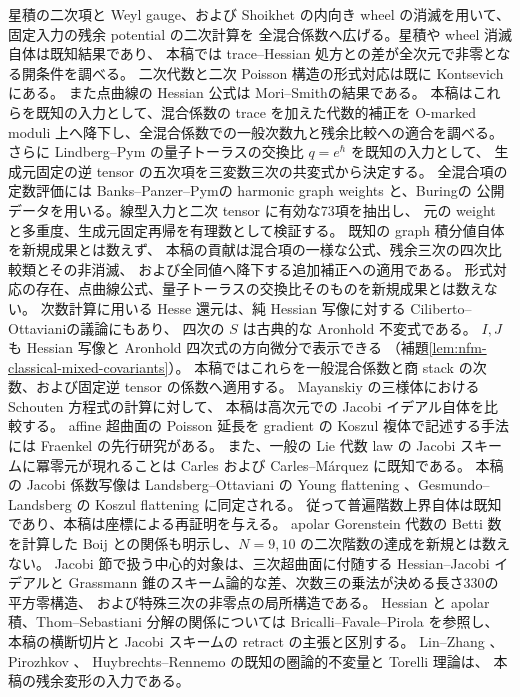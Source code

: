 星積の二次項と Weyl gauge、および Shoikhet\cite[Sections~1.3, 2.3.1]{NFMShoikhet}
の内向き wheel の消滅を用いて、固定入力の残余 potential の二次計算を
全混合係数へ広げる。星積や wheel 消滅自体は既知結果であり、
本稿では trace--Hessian 処方との差が全次元で非零となる開条件を調べる。
二次代数と二次 Poisson 構造の形式対応は既に
Kontsevich\cite[Section~2.3, Proposition~6]{NFMKontsevichAlg}にある。
また点曲線の Hessian 公式は Mori--Smith\cite[Theorems~1.2, 7.2]{MoriSmith}の結果である。
本稿はこれらを既知の入力として、混合係数の trace を加えた代数的補正を
O-marked moduli 上へ降下し、全混合係数での一般次数九と残余比較への適合を調べる。
さらに Lindberg--Pym\cite[Section~1.6; Theorem~6.9 and Remark~6.10]{NFMLindbergPym}
の量子トーラスの交換比 $q=e^\hbar$ を既知の入力として、
生成元固定の逆 tensor の五次項を三変数三次の共変式から決定する。
全混合項の定数評価には
Banks--Panzer--Pym\cite[Corollary~1.3; Section~6]{NFMBanksPanzerPym}の
harmonic graph weights と、Buring\cite[Sections~3.4--3.6]{NFMBuringGraphs}の
公開データを用いる。線型入力と二次 tensor に有効な73項を抽出し、
元の weight と多重度、生成元固定再帰を有理数として検証する。
既知の graph 積分値自体を新規成果とは数えず、
本稿の貢献は混合項の一様な公式、残余三次の四次比較類とその非消滅、
および全同値へ降下する追加補正への適用である。
形式対応の存在、点曲線公式、量子トーラスの交換比そのものを新規成果とは数えない。
次数計算に用いる Hesse 還元は、純 Hessian 写像に対する
Ciliberto--Ottaviani\cite[Theorem~5.7]{NFMCilibertoOttaviani}の議論にもあり、
四次の $S$ は古典的な Aronhold 不変式\cite{NFMOttavianiAronhold}である。
$I,J$ も Hessian 写像と Aronhold 四次式の方向微分で表示できる
（補題\ref{lem:nfm-classical-mixed-covariants}）。
本稿ではこれらを一般混合係数と商 stack の次数、および固定逆 tensor の係数へ適用する。
Mayanskiy \cite{Mayanskiy} の三様体における Schouten 方程式の計算に対して、
本稿は高次元での Jacobi イデアル自体を比較する。
affine 超曲面の Poisson 延長を gradient の Koszul 複体で記述する手法には
Fraenkel \cite[Proposition~4.1, Theorem~4.3]{Fraenkel} の先行研究がある。
また、一般の Lie 代数 law の Jacobi スキームに冪零元が現れることは
Carles \cite[Section~8, Lemma~8.35]{Carles} および
Carles--M\'arquez \cite[Section~3]{CarlesMarquez} に既知である。
本稿の Jacobi 係数写像は Landsberg--Ottaviani の Young flattening
\cite{LandsbergOttavianiYoung}、Gesmundo--Landsberg の Koszul flattening
\cite[Proposition~6.1]{GesmundoLandsbergPartials}に同定される。
従って普遍階数上界自体は既知であり、本稿は座標による再証明を与える。
apolar Gorenstein 代数の Betti 数を計算した Boij \cite[Remark~6]{NFMBoijBetti}
との関係も明示し、$N=9,10$ の二次階数の達成を新規とは数えない。
Jacobi 節で扱う中心的対象は、三次超曲面に付随する Hessian--Jacobi イデアルと
Grassmann 錐のスキーム論的な差、次数三の乗法が決める長さ330の平方零構造、
および特殊三次の非零点の局所構造である。
Hessian と apolar 積、Thom--Sebastiani 分解の関係については
Bricalli--Favale--Pirola \cite[Proposition~2.1, Theorem~3.4]{NFMBFFHessian}を参照し、
本稿の横断切片と Jacobi スキームの retract の主張と区別する。
Lin--Zhang \cite{NFLZSerre}、Pirozhkov \cite{NFPirozhkov}、
Huybrechts--Rennemo \cite{NFHuybrechtsRennemo} の既知の圏論的不変量と Torelli 理論は、
本稿の残余変形の入力である。

